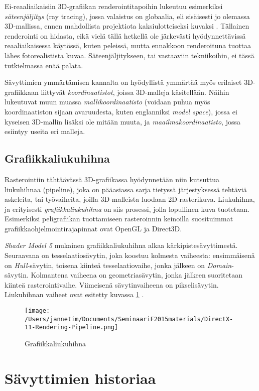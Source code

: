 \documentclass[finnish]{tktltiki2}
\theoremstyle{definition}
\theoremstyle{remark}
\begin{document}
Ei-reaaliaikaisiin 3D-grafiikan renderointitapoihin lukeutuu esimerkiksi \emph{säteenjäljitys} (ray tracing), jossa valaistus on globaalia, eli sisäisesti jo olemassa 3D-mallissa, ennen mahdollista projektiota kaksiulotteiseksi kuvaksi \cite{Puh08}. Tällainen renderointi on hidasta, eikä vielä tällä hetkellä ole järkevästi hyödynnettävissä reaaliaikaisessa käytössä, kuten peleissä, mutta ennakkoon renderoituna tuottaa lähes fotorealistista kuvaa. Säteenjäljitykseen, tai vastaaviin tekniikoihin, ei tässä tutkielmassa enää palata.

Sävyttimien ymmärtämisen kannalta on hyödyllistä ymmärtää myös erilaiset 3D-grafiikkaan liittyvät \emph{koordinaatistot}, joissa 3D-malleja käsitellään. Näihin lukeutuvat muun muassa \emph{mallikoordinaatisto} (voidaan puhua myös koordinaatiston sijaan avaruudesta, kuten englanniksi \emph{model space}), jossa ei kyseisen 3D-mallin lisäksi ole mitään muuta, ja \emph{maailmakoordinaatisto}, jossa esiintyy useita eri malleja.

\subsection{Grafiikkaliukuhihna}
Rasterointiin tähtäävässä 3D-grafiikassa hyödynnetään niin kutsuttua liukuhihnaa (pipeline), joka on pääasiassa sarja tietyssä järjestyksessä tehtäviä askeleita, tai työvaiheita, joilla 3D-malleista luodaan 2D-rasterikuva. Liukuhihna, ja erityisesti \emph{grafiikkaliukuhihna} on siis prosessi, jolla lopullinen kuva tuotetaan. Esimerkiksi peligrafiikan tuottamiseen rasteroinnin keinoilla suosituimmat grafiikkaohjelmointirajapinnat ovat OpenGL ja Direct3D.

\emph{Shader Model 5} mukainen grafiikkaliukuhihna alkaa kärkipistesävyttimestä. Seuraavana on tesselaatiosävytin, joka koostuu kolmesta vaiheesta: ensimmäisenä on \emph{Hull}-sävytin, toisena kiinteä tesselaatiovaihe, jonka jälkeen on \emph{Domain}-sävytin. Kolmantena vaiheena on geometriasävytin, jonka jälkeen suoritetaan kiinteä rasterointivaihe. Viimeisenä sävytinvaiheena on pikselisävytin. Liukuhihnan vaiheet ovat esitetty kuvassa \ref{gpipe} \cite{Mic11}.

\begin{figure}[!htbp]
\centering
\texttt{[image: /Users/jannetim/Documents/SeminaariF2015materials/DirectX-11-Rendering-Pipeline.png]}
\caption{Grafiikkaliukuhihna}
\label{gpipe}
\end{figure}

\section{Sävyttimien historiaa}
\end{document}
